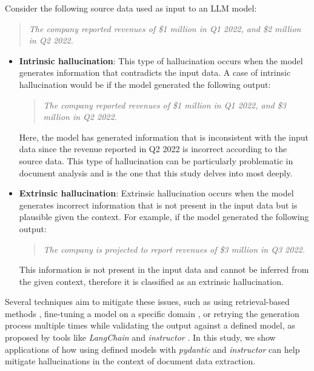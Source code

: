 \documentclass[english, 12pt, a4paper, elec, utf8, a-2b, online]{aaltothesis}
\begin{document}
Consider the following source data used as input to an \ac{LLM} model:

\begin{quote}
    \textit{The company reported revenues of \$1 million in Q1 2022, and \$2 million in Q2 2022.}
\end{quote}

\begin{itemize}
    \label{list:hallucinations:1}
    \item \textbf{Intrinsic hallucination}: This type of hallucination occurs when the model generates information that contradicts the input data.
    A case of intrinsic hallucination would be if the model generated the following output:
    \begin{quote}
        \textit{The company reported revenues of \$1 million in Q1 2022, and \$3 million in Q2 2022.}
    \end{quote}
    Here, the model has generated information that is inconsistent with the input data since the revenue reported in Q2 2022 is incorrect according to the source data.
    This type of hallucination can be particularly problematic in document analysis and is the one that this study delves into most deeply.
    \item \textbf{Extrinsic hallucination}: Extrinsic hallucination occurs when the model generates incorrect information that is not present in the input data but is plausible given the context.
    For example, if the model generated the following output:
    \begin{quote}
        \textit{The company is projected to report revenues of \$3 million in Q3 2022.}
    \end{quote}
    This information is not present in the input data and cannot be inferred from the given context, therefore it is classified as an extrinsic hallucination.
\end{itemize}

Several techniques aim to mitigate these issues, such as using retrieval-based methods \cite{lewis2020retrievalaugmented}, fine-tuning a model on a specific domain \cite{Brown2020}, or retrying the generation process multiple times while validating the output against a defined model, as proposed by tools like \textit{LangChain} \cite{Chase_LangChain_2022} and \textit{instructor} \cite{Instructor2023}.
In this study, we show applications of how using defined models with \textit{pydantic} \cite{pydantic} and \textit{instructor} can help mitigate hallucinations in the context of document data extraction.
\end{document}
